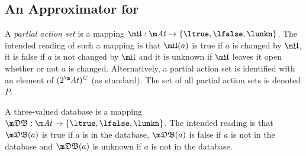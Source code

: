 
% 

\subsection{An Approximator for \Op}

A \emph{partial action set} is a mapping $\UUU:\atoms \to \{\ltrue,\lfalse,\lunkn\}$.
The intended reading of such a mapping is that $\UUU(a)$ is true if $a$ is changed by $\UUU$, it is false if $a$ is not changed by $\UUU$ and it is unknown if $\UUU$ leaves it open whether or not $a$ is changed. 
Alternatively, a partial action set is identified with an element of $(2^\atoms)^C$ (as standard). 
The set of all partial action sets is denoted $P$.

A three-valued database is a mapping $\tdb: \atoms \to \{\ltrue,\lfalse,\lunkn\}$.
The intended reading is that $\tdb(a)$ is true if $a$ is in the database, $\tdb(a)$ is false if $a$ is not in the database and $\tdb(a)$ is unknown if $a$ is not in the database. 

